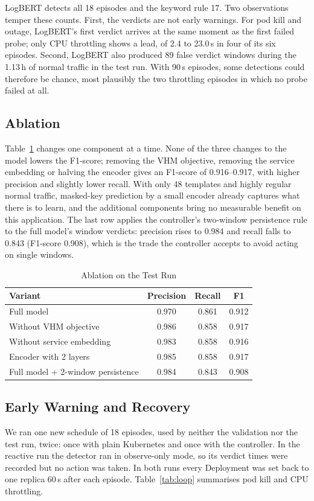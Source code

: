 \documentclass[journal]{IEEEtran}
\begin{document}
LogBERT detects all 18 episodes and the keyword rule 17. Two observations temper these counts. First, the verdicts are not early warnings. For pod kill and outage, LogBERT's first verdict arrives at the same moment as the first failed probe; only CPU throttling shows a lead, of 2.4 to 23.0\,s in four of its six episodes. Second, LogBERT also produced 89 false verdict windows during the 1.13\,h of normal traffic in the test run. With 90\,s episodes, some detections could therefore be chance, most plausibly the two throttling episodes in which no probe failed at all.

\subsection{Ablation}
Table~\ref{tab:ablation} changes one component at a time. None of the three changes to the model lowers the F1-score; removing the VHM objective, removing the service embedding or halving the encoder gives an F1-score of 0.916--0.917, with higher precision and slightly lower recall. With only 48 templates and highly regular normal traffic, masked-key prediction by a small encoder already captures what there is to learn, and the additional components bring no measurable benefit on this application. The last row applies the controller's two-window persistence rule to the full model's window verdicts: precision rises to 0.984 and recall falls to 0.843 (F1-score 0.908), which is the trade the controller accepts to avoid acting on single windows.

\begin{table}[!t]
\centering
\caption{Ablation on the Test Run}
\label{tab:ablation}
\begin{tabular}{@{}lccc@{}}
\toprule
Variant & Precision & Recall & F1 \\
\midrule
Full model & 0.970 & 0.861 & 0.912 \\
Without VHM objective & 0.986 & 0.858 & 0.917 \\
Without service embedding & 0.983 & 0.858 & 0.916 \\
Encoder with 2 layers & 0.985 & 0.858 & 0.917 \\
Full model + 2-window persistence & 0.984 & 0.843 & 0.908 \\
\bottomrule
\end{tabular}

\end{table}

\subsection{Early Warning and Recovery}
We ran one new schedule of 18 episodes, used by neither the validation nor the test run, twice: once with plain Kubernetes and once with the controller. In the reactive run the detector ran in observe-only mode, so its verdict times were recorded but no action was taken. In both runs every Deployment was set back to one replica 60\,s after each episode. Table~\ref{tab:loop} summarises pod kill and CPU throttling.
\end{document}
